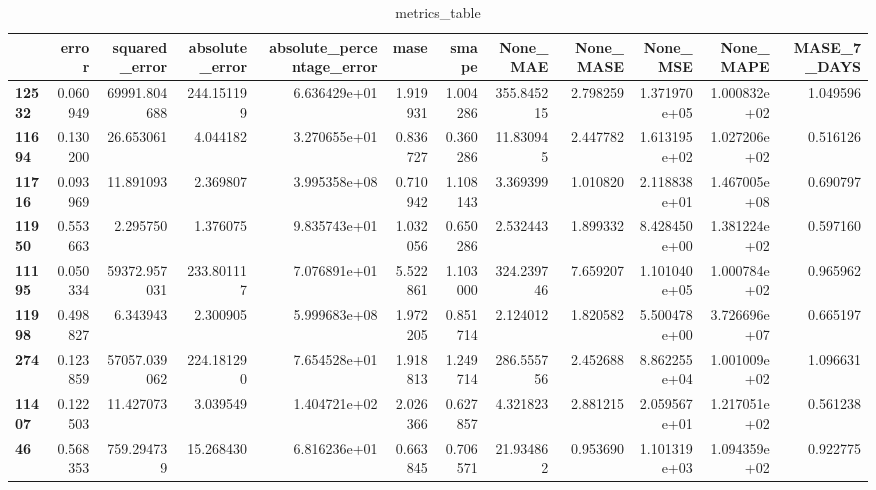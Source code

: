 \begin{table}[h]
\centering
\caption{metrics_table}
\label{table:Experiment with CNN AE and LSTM hybrid method. Local, univariate, dataset 2. Tuned with LSTM Local Univariate dataset 2}
\begin{tabular}{lrrrrrrrrrrr}
\toprule
{} &     error &  squared\_error &  absolute\_error &  absolute\_percentage\_error &      mase &     smape &     None\_MAE &  None\_MASE &      None\_MSE &     None\_MAPE &  MASE\_7\_DAYS \\
\midrule
\textbf{12532} &  0.060949 &   69991.804688 &      244.151199 &               6.636429e+01 &  1.919931 &  1.004286 &   355.845215 &   2.798259 &  1.371970e+05 &  1.000832e+02 &     1.049596 \\
\textbf{11694} &  0.130200 &      26.653061 &        4.044182 &               3.270655e+01 &  0.836727 &  0.360286 &    11.830945 &   2.447782 &  1.613195e+02 &  1.027206e+02 &     0.516126 \\
\textbf{11716} &  0.093969 &      11.891093 &        2.369807 &               3.995358e+08 &  0.710942 &  1.108143 &     3.369399 &   1.010820 &  2.118838e+01 &  1.467005e+08 &     0.690797 \\
\textbf{11950} &  0.553663 &       2.295750 &        1.376075 &               9.835743e+01 &  1.032056 &  0.650286 &     2.532443 &   1.899332 &  8.428450e+00 &  1.381224e+02 &     0.597160 \\
\textbf{11195} &  0.050334 &   59372.957031 &      233.801117 &               7.076891e+01 &  5.522861 &  1.103000 &   324.239746 &   7.659207 &  1.101040e+05 &  1.000784e+02 &     0.965962 \\
\textbf{11998} &  0.498827 &       6.343943 &        2.300905 &               5.999683e+08 &  1.972205 &  0.851714 &     2.124012 &   1.820582 &  5.500478e+00 &  3.726696e+07 &     0.665197 \\
\textbf{274  } &  0.123859 &   57057.039062 &      224.181290 &               7.654528e+01 &  1.918813 &  1.249714 &   286.555756 &   2.452688 &  8.862255e+04 &  1.001009e+02 &     1.096631 \\
\textbf{11407} &  0.122503 &      11.427073 &        3.039549 &               1.404721e+02 &  2.026366 &  0.627857 &     4.321823 &   2.881215 &  2.059567e+01 &  1.217051e+02 &     0.561238 \\
\textbf{46   } &  0.568353 &     759.294739 &       15.268430 &               6.816236e+01 &  0.663845 &  0.706571 &    21.934862 &   0.953690 &  1.101319e+03 &  1.094359e+02 &     0.922775 \\

\end{tabular}
\end{table}
